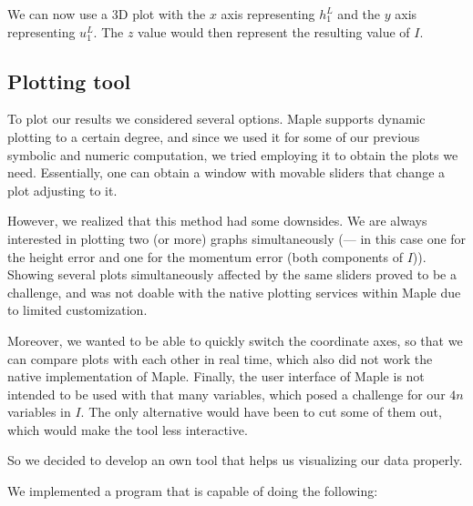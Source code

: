 \documentclass{article}
\newcommand{\todo}[2][]{\textcolor{red}{TODO\ifthenelse{\equal{#1}{}}{}{[#1]}: #2}}
\begin{document}
We can now use a 3D plot with the $x$ axis representing $h_1^L$ and the $y$ axis representing $u_1^L$. The $z$ value would then represent the resulting value of $I$.

\subsection{Plotting tool}
\label{sec:plotting-tool-intro}

To plot our results we considered several options. Maple supports dynamic plotting to a certain degree, and since we used it for some of our previous symbolic and numeric computation, we tried employing it to obtain the plots we need. Essentially, one can obtain a window with movable sliders that change a plot adjusting to it.

However, we realized that this method had some downsides. We are always interested in plotting two (or more) graphs simultaneously (--- in this case one for the height error and one for the momentum error (both components of $I$)). Showing several plots simultaneously affected by the same sliders proved to be a challenge, and was not doable with the native plotting services within Maple due to limited customization. 


Moreover, we wanted to be able to quickly switch the coordinate axes, so that we can compare plots with each other in real time, which also did not work the native implementation of Maple. Finally, the user interface of Maple is not intended to be used with that many variables, which posed a challenge for our $4n$ variables in $I$. The only alternative would have been to cut some of them out, which would make the tool less interactive.

So we decided to develop an own tool that helps us visualizing our data properly.

We implemented a program that is capable of doing the following:
\end{document}
